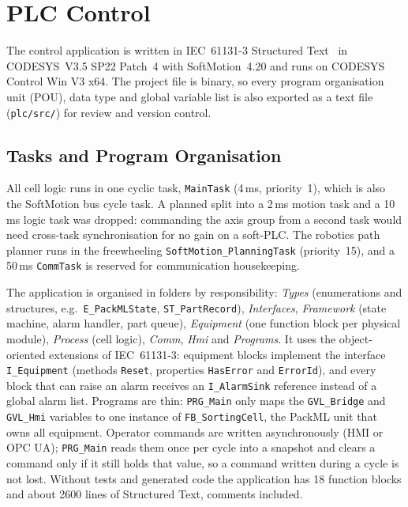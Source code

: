 \section{PLC Control}\label{sec:plc}

The control application is written in IEC~61131-3 Structured Text~\cite{IEC61131-3} in
CODESYS~V3.5 SP22 Patch~4 with SoftMotion~4.20 and runs on CODESYS Control Win V3 x64. The
project file is binary, so every program organisation unit (POU), data type and global variable
list is also exported as a text file (\texttt{plc/src/}) for review and version control.

\subsection{Tasks and Program Organisation}

All cell logic runs in one cyclic task, \texttt{MainTask} (4\,ms, priority~1), which is also the
SoftMotion bus cycle task. A planned split into a 2\,ms motion task and a 10\,ms logic task was
dropped: commanding the axis group from a second task would need cross-task synchronisation for
no gain on a soft-PLC. The robotics path planner runs in the freewheeling
\texttt{SoftMotion\_PlanningTask} (priority~15), and a 50\,ms \texttt{CommTask} is reserved for
communication housekeeping.

The application is organised in folders by responsibility: \emph{Types} (enumerations and
structures, e.g.\ \texttt{E\_PackMLState}, \texttt{ST\_PartRecord}), \emph{Interfaces},
\emph{Framework} (state machine, alarm handler, part queue), \emph{Equipment} (one function block
per physical module), \emph{Process} (cell logic), \emph{Comm}, \emph{Hmi} and \emph{Programs}. It
uses the object-oriented extensions of IEC~61131-3: equipment blocks implement the interface
\texttt{I\_Equipment} (methods \texttt{Reset}, properties \texttt{HasError} and
\texttt{ErrorId}), and every block that can raise an alarm receives an \texttt{I\_AlarmSink}
reference instead of a global alarm list. Programs are thin: \texttt{PRG\_Main} only maps the
\texttt{GVL\_Bridge} and \texttt{GVL\_Hmi} variables to one instance of \texttt{FB\_SortingCell},
the PackML unit that owns all equipment. Operator commands are written asynchronously (HMI or
OPC UA); \texttt{PRG\_Main} reads them once per cycle into a snapshot and clears a command only
if it still holds that value, so a command written during a cycle is not lost. Without tests and
generated code the application has 18 function blocks and about 2600 lines of Structured Text,
comments included.

